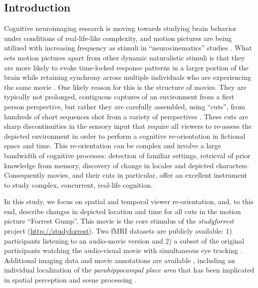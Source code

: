 \documentclass[10pt,a4paper]{article}
\begin{document}
\begin{multicols}{2}

\section*{Introduction}

Cognitive neuroimaging research is moving towards studying brain behavior under
conditions of real-life-like complexity, and motion pictures are being utilized
with increasing frequency as stimuli in ``neurocinematics'' studies
\citep{hasson_2008_neurocinematics}. What sets motion pictures apart from other
dynamic naturalistic stimuli is that they are more likely to evoke time-locked
response patterns in a larger portion of the brain while retaining synchrony
across multiple individuals who are experiencing the same movie
\citep{hasson_2009_natural_stim_review,lankinen_2014_MEG_during_movie}. One
likely reason for this is the structure of movies. They are typically not
prolonged, contiguous captures of an environment from a first person
perspective, but rather they are carefully assembled, using ``cuts'', from
hundreds of short sequences shot from a variety of perspectives
\citep{cutting_2011_changing_poetics_of_dissolve}. These cuts are sharp
discontinuities in the sensory input that require all viewers to re-assess the
depicted environment in order to perform a cognitive re-orientation in fictional
space and time. This re-orientation can be complex and involve a
large bandwidth of cognitive processes: detection of familiar settings,
retrieval of prior knowledge from memory, discovery of change in locales and
depicted characters. Consequently movies, and their cuts in particular, offer an
excellent instrument to study complex, concurrent, real-life cognition.


In this study, we focus on spatial and temporal viewer re-orientation, and, to
this end, describe changes in depicted location and time for all cuts in the
motion picture ``Forrest Gump''. This movie is the core stimulus of the
\textit{studyforrest} project (\url{http://studyforrest}). Two fMRI datasets
are publicly available: 1) participants listening to an audio-movie version
\citep{HBI+14} and 2) a subset of the original participants watching the
audio-visual movie with simultaneous eye tracking \citep{HAK+16}. Additional
imaging data and movie annotations are available \citep{HDH+2015,LRS+2015},
including an individual localization of the \textit{parahippocampal place area}
\citep{SKG+16} that has been implicated in spatial perception and scene
processing \citep{EK1998}.


\end{multicols}
\end{document}
